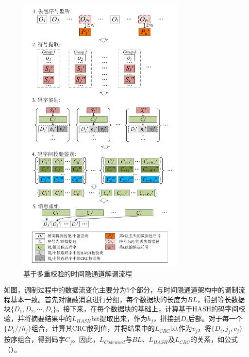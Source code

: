 {    \begin{figure}
        \centering
        \includegraphics[width=0.75\textwidth]{chapters/chapter5/figures/demodulation-flow.pdf}
        \caption{基于多重校验的时间隐通道解调流程}
        \label{fig:5:demodulation-flow}
    \end{figure}
}

如图，调制过程中的数据流变化主要分为5个部分，与时间隐通道架构中的调制流程基本一致。首先对隐蔽消息进行分组，每个数据块的长度为$BL$，得到等长数据块$\{D_{1},D_{2},\cdots , D_{i}\}$。接下来，在每个数据块的基础上，计算基于HASH的码字间校验，并将摘要结果中的$L_{HASH}$bit提取出来，作为$h_{j}$，拼接到$D_{i}$后部。对于每一个$\{D_{i}//h_{j}\}$组合，计算其CRC散列值，并将结果中的$L_{CRC}$bit作为$v_{j}$，将$\{D_{i},j_{j},v_{j}\}$按序组合，得到码字$C_{j}$。因此，$L_{Codeword}$与$BL$、$L_{HASH}$及$L_{CRC}$的关系，如公式（）。



